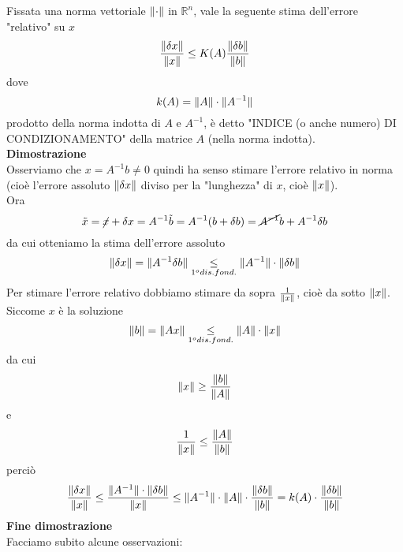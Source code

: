 \documentclass[12pt,a4paper]{article}
\DeclarePairedDelimiter{\norma}{\lVert}{\rVert}
\begin{document}
Fissata una norma vettoriale $\norma{\cdot}$ in $\mathbb{R}^n$, vale la seguente stima dell'errore "relativo" su $x$
\begin{equation*}
    \frac{\norma{\delta x}}{\norma{x}} \leq K(A) \frac{\norma{\delta b}}{\norma{b}}
\end{equation*}
dove 
\begin{equation*}
    k(A)=\norma{A}\cdot\norma{A^{-1}}
\end{equation*}
prodotto della norma indotta di $A$ e $A^{-1}$, è detto "INDICE (o anche numero) DI CONDIZIONAMENTO" della matrice $A$ (nella norma indotta).\\
\textbf{Dimostrazione}\\Osserviamo che $x=A^{-1}b\neq0$ quindi ha senso stimare l'errore relativo in norma (cioè l'errore assoluto $\norma{\delta x}$ diviso per la "lunghezza" di $x$, cioè $\norma{x}$). \\Ora
\begin{equation*}
    \tilde{x}=\cancel{x}+\delta x =A^{-1}\tilde{b}=A^{-1}(b+\delta b)=\cancel{A^{-1}}b+A^{-1}\delta b
\end{equation*}
da cui otteniamo la stima dell'errore assoluto
\begin{equation*}
    \norma{\delta x}=\norma{A^{-1}\delta b}\underset{1^o dis. fond.}{\leq}\norma{A^{-1}}\cdot\norma{\delta b}
\end{equation*}
Per stimare l'errore relativo dobbiamo stimare da sopra $\frac{1}{\norma{x}}$, cioè da sotto $\norma{x}$.\\Siccome $x$ è la soluzione 
\begin{equation*}
    \norma{b}=\norma{Ax}\underset{1^o dis. fond.}{\leq}\norma{A}\cdot\norma{x}
\end{equation*}
da cui
\begin{equation*}
    \norma{x}\geq\frac{\norma{b}}{\norma{A}}
\end{equation*}
e
\begin{equation*}
    \frac{1}{\norma{x}} \le \frac{\norma{A}}{\norma{b}}
\end{equation*}
perciò
\begin{equation*}
    \frac{\norma{\delta x}}{\norma{x}}\leq \frac{\norma{A^{-1}}\cdot\norma{\delta b}}{\norma{x}}\leq \norma{A^{-1}}\cdot\norma{A}\cdot\frac{\norma{\delta b}}{\norma{b}}=k(A)\cdot\frac{\norma{\delta b}}{\norma{b}}
\end{equation*}
\textbf{Fine dimostrazione}\\
Facciamo subito alcune osservazioni:\\
\end{document}
